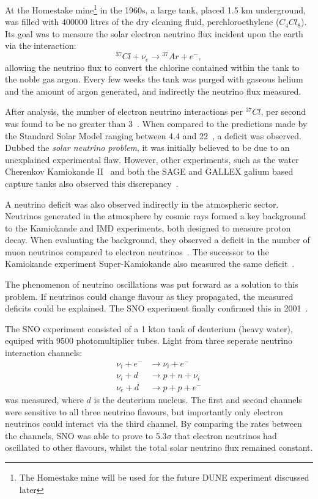 At the Homestake mine\footnote{The Homestake mine will be used for the future DUNE experiment
    discussed later} in the 1960s, a large tank, placed 1.5 km underground, was filled with
400000 litres of the dry cleaning fluid, perchloroethylene ($C_{4}Cl_{8}$). Its goal was to
measure the solar electron neutrino flux incident upon the earth via the interaction:
\begin{equation} %
    {}^{37}Cl+\nu_{e}\rightarrow{}^{37}Ar+e^{-},
\end{equation} %
allowing the neutrino flux to convert the chlorine contained within the tank to the noble gas
argon. Every few weeks the tank was purged with gaseous helium and the amount of argon generated,
and indirectly the neutrino flux measured.

After analysis, the number of electron neutrino interactions per ${}^{37}Cl$, per second was found
to be no greater than 3~\cite{davis1968}. When compared to the predictions made by the Standard
Solar Model ranging between 4.4 and 22~\cite{bahcall1968}, a deficit was observed. Dubbed the
\emph{solar neutrino problem}, it was initially believed to be due to an unexplained experimental
flaw. However, other experiments, such as the water Cherenkov Kamiokande II~\cite{hirata1989} and
both the SAGE and GALLEX galium based capture tanks also observed this
discrepancy~\cite{abazov1991,anselmann1994}.

A neutrino deficit was also observed indirectly in the atmospheric sector. Neutrinos generated in
the atmosphere by cosmic rays formed a key background to the Kamiokande and IMD experiments, both
designed to measure proton decay. When evaluating the background, they observed a deficit in the
number of muon neutrinos compared to electron neutrinos~\cite{hirata1988, becker1992}. The
successor to the Kamiokande experiment Super-Kamiokande also measured the same
deficit~\cite{kajita1999}.

The phenomenon of neutrino oscillations was put forward as a solution to this problem. If
neutrinos could change flavour as they propagated, the measured deficits could be explained. The
SNO experiment finally confirmed this in 2001~\cite{ahmad2002}.

The SNO experiment consisted of a 1 kton tank of deuterium (heavy water), equiped with 9500
photomultiplier tubes. Light from three seperate neutrino interaction channels:
\begin{align} %
    \nu_{i}+e^{-} & \rightarrow \nu_{i}+e^{-} \\
    \nu_{i}+d     & \rightarrow p+n+\nu_{i}   \\
    \nu_{e}+d     & \rightarrow p+p+e^{-}
\end{align}
was measured, where $d$ is the deuterium nucleus. The first and second channels were sensitive to
all three neutrino flavours, but importantly only electron neutrinos could interact via the third
channel. By comparing the rates between the channels, SNO was able to prove to 5.3$\sigma$ that
electron neutrinos had oscillated to other flavours, whilst the total solar neutrino flux remained
constant.

